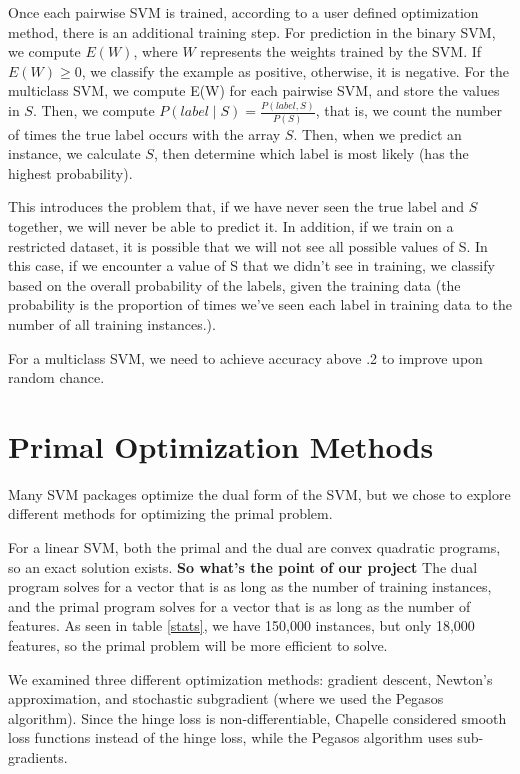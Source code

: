 \documentclass[letterpaper, 11pt]{article}
\begin{document}
Once each pairwise SVM is trained, according to a user defined optimization method, there is an additional training step.  For prediction in the binary SVM, we compute $E(W)$, where $W$ represents the weights trained by the SVM.  If $E(W) \ge 0$, we classify the example as positive, otherwise, it is negative.  For the multiclass SVM, we compute E(W) for each pairwise SVM, and store the values in $S$.  Then, we compute $P(label \mid S) = \frac{P(label, S)}{P(S)}$, that is, we count the number of times the true label occurs with the array $S$.  Then, when we predict an instance, we calculate $S$, then determine which label is most likely (has the highest probability).

This introduces the problem that, if we have never seen the true label and $S$ together, we will never be able to predict it.  In addition, if we train on a restricted dataset, it is possible that we will not see all possible values of S.  In this case, if we encounter a value of S that we didn't see in training, we classify based on the overall probability of the labels, given the training data (the probability is the proportion of times we've seen each label in training data to the number of all training instances.).

For a multiclass SVM, we need to achieve accuracy above .2 to improve upon random chance.

\section{Primal Optimization Methods}
Many SVM packages optimize the dual form of the SVM, but we chose to explore different methods for optimizing the primal problem.

For a linear SVM, both the primal and the dual are convex quadratic programs, so an exact solution exists.  \textbf{So what's the point of our project}  The  dual program solves for a vector that is as long as the number of training instances, and the primal program solves for a vector that is as long as the number of features.  As seen in table \ref{stats}, we have 150,000 instances, but only 18,000 features, so the primal problem will be more efficient to solve.

We examined three different optimization methods: gradient descent, Newton's approximation, and stochastic subgradient (where we used the Pegasos algorithm).  Since the hinge loss is non-differentiable, Chapelle considered smooth loss functions instead of the hinge loss\cite{chapelle2007training}, while the Pegasos algorithm\cite{pegasos} uses sub-gradients.
\end{document}
